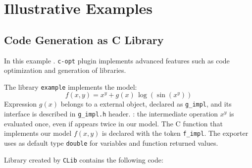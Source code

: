 
\section{Illustrative Examples}
\label{sec:examples}

\subsection{Code Generation as C Library}
In this example . \texttt{c-opt} plugin implements advanced features such as code optimization and generation of libraries.

The library \texttt{example} implements the model:
\begin{equation}
f(x, y) = x^y + g(x)\, \log(\sin(x^y))
\end{equation}
Expression $g(x)$ belongs to a external object, declared as \texttt{g\_impl}, and its interface is described in \texttt{g\_impl.h} header. : the intermediate operation $x^y$ is evaluated once, even if appears twice in our model. The C function that implements our model $f(x,y)$ is declared with the token \texttt{f\_impl}. The exporter uses as default type \texttt{double} for variables and function returned values.

\noindent%


Library created by \texttt{CLib} contains the following code:

\noindent%
\begin{minipage}{.5\textwidth}

\end{minipage}\hfill
\begin{minipage}{.5\textwidth}

\end{minipage}

